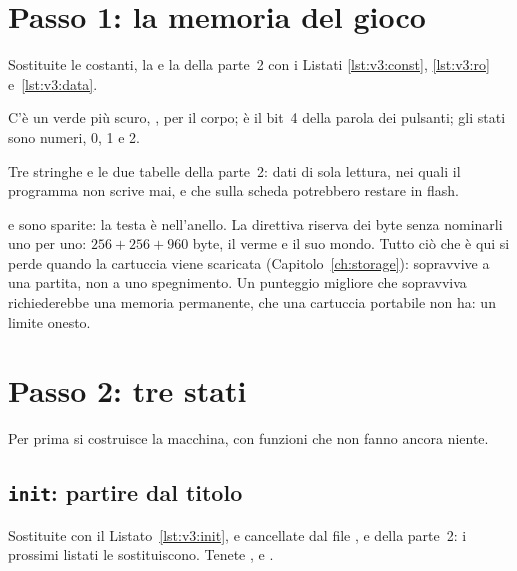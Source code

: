 \section{Passo 1: la memoria del gioco}

Sostituite le costanti, la  e la  della parte~2 con i
Listati \ref{lst:v3:const}, \ref{lst:v3:ro} e~\ref{lst:v3:data}.


C'è un verde più scuro, , per il corpo;  è il bit~4
della parola dei pulsanti; gli stati sono numeri, 0, 1 e 2.


Tre stringhe e le due tabelle della parte~2: dati di sola lettura, nei quali il
programma non scrive mai, e che sulla scheda potrebbero restare in flash.


 e  sono sparite: la testa è nell'anello. La
direttiva  riserva dei byte senza nominarli uno per uno:
$256+256+960$ byte, il verme e il suo mondo. Tutto ciò che è qui si perde
quando la cartuccia viene scaricata (Capitolo~\ref{ch:storage}): 
sopravvive a una partita, non a uno spegnimento. Un punteggio migliore che
sopravviva richiederebbe una memoria permanente, che una cartuccia portabile
non ha: un limite onesto.

\section{Passo 2: tre stati}

Per prima si costruisce la macchina, con funzioni che non fanno ancora niente.

\subsection{\texttt{init}: partire dal titolo}

Sostituite  con il Listato~\ref{lst:v3:init}, e cancellate
dal file ,  e  della parte~2:
i prossimi listati le sostituiscono. Tenete ,
 e .

